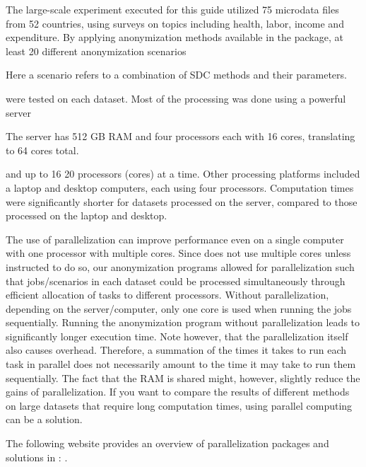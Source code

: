 \documentclass[letterpaper,10pt,english]{sphinxmanual}
\begin{document}
The large-scale experiment executed for this guide utilized 75 microdata
files from 52 countries, using surveys on topics including health,
labor, income and expenditure. By applying anonymization methods
available in the  package, at least 20 different anonymization
scenarios %
\begin{footnote}[9]\sphinxAtStartFootnote
Here a scenario refers to a combination of SDC methods and their
parameters.
%
\end{footnote} were tested on each dataset. Most of the
processing was done using a powerful server %
\begin{footnote}[10]\sphinxAtStartFootnote
The server has 512 GB RAM and four processors each with 16 cores,
translating to 64 cores total.
%
\end{footnote} and up
to 16 \textendash{} 20 processors (cores) at a time. Other processing platforms
included a laptop and desktop computers, each using four processors.
Computation times were significantly shorter for datasets processed on
the server, compared to those processed on the laptop and desktop.

The use of parallelization can improve performance even on a single
computer with one processor with multiple cores. Since  does not use
multiple cores unless instructed to do so, our anonymization programs
allowed for parallelization such that jobs/scenarios in each dataset
could be processed simultaneously through efficient allocation of tasks
to different processors. Without parallelization, depending on the
server/computer, only one core is used when running the jobs
sequentially. Running the anonymization program without parallelization
leads to significantly longer execution time. Note however, that the
parallelization itself also causes overhead. Therefore, a summation of
the times it takes to run each task in parallel does not necessarily
amount to the time it may take to run them sequentially. The fact that
the RAM is shared might, however, slightly reduce the gains of
parallelization. If you want to compare the results of different methods
on large datasets that require long computation times, using parallel
computing can be a solution. %
\begin{footnote}[11]\sphinxAtStartFootnote
The following website provides an overview of parallelization
packages and solutions in :
.
%
\end{footnote}
\end{document}
